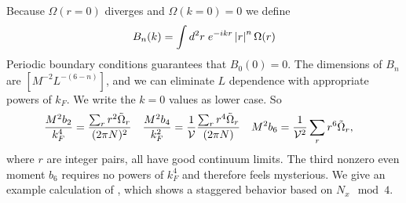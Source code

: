 Because $\Omega(r=0)$ diverges and $\Omega(k=0)=0$ we define
\begin{align}
	B_n(k) = \int d^2r\; e^{-i k r} \left| r \right|^n \Omega(r) 
\end{align}
Periodic boundary conditions guarantees that $B_0(0) = 0$.
The dimensions of $B_n$ are $[M^{-2} L^{-(6-n)}]$, and we can eliminate $L$ dependence with appropriate powers of $k_F$.
We write the $k=0$ values as lower case.
So 
\begin{align}
	\frac{M^2 b_2}{k_F^4} &= \frac{\sum_r r^2 \tilde{\Omega}_r}{(2\pi N)^2}
	&
	\frac{M^2 b_4}{k_F^2} &= \frac{1}{\mathcal{V}} \frac{\sum_r r^4 \tilde{\Omega}_r}{(2\pi N)}
	&
	M^2 b_6 &= \frac{1}{\mathcal{V}^2}\sum_r r^6 \tilde{\Omega}_r,
	\label{eq:voricity moments}
\end{align}
where $r$ are integer pairs, all have good continuum limits.
The third nonzero even moment $b_6$ requires no powers of $k_F^4$ and therefore feels mysterious.
We give an example calculation of , which shows a staggered behavior based on $N_x\mod{4}$.
